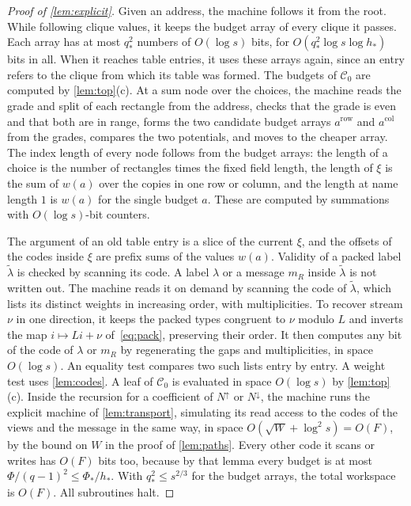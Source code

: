 \documentclass[11pt]{article}
\theoremstyle{definition}
\theoremstyle{definition}
\theoremstyle{remark}
\newcommand{\row}{\mathrm{row}}
\newcommand{\col}{\mathrm{col}}
\newcommand{\Nup}{N^{\uparrow}}
\newcommand{\Ndown}{N^{\downarrow}}
\begin{document}
\begin{proof}[Proof of \cref{lem:explicit}]
Given an address, the machine follows it from the root. While following clique values, it keeps the budget array of every clique it passes. Each array has at most $q_*^2$ numbers of $O(\log s)$ bits, for $O(q_*^2\log s\log h_*)$ bits in all. When it reaches table entries, it uses these arrays again, since an entry refers to the clique from which its table was formed. The budgets of $\mathcal C_0$ are computed by \cref{lem:top}(c). At a sum node over the choices, the machine reads the grade and split of each rectangle from the address, checks that the grade is even and that both are in range, forms the two candidate budget arrays $a^\row$ and $a^\col$ from the grades, compares the two potentials, and moves to the cheaper array. The index length of every node follows from the budget arrays: the length of a choice is the number of rectangles times the fixed field length, the length of $\xi$ is the sum of $w(a)$ over the copies in one row or column, and the length at name length $1$ is $w(a)$ for the single budget $a$. These are computed by summations with $O(\log s)$-bit counters.

The argument of an old table entry is a slice of the current $\xi$, and the offsets of the codes inside $\xi$ are prefix sums of the values $w(a)$. Validity of a packed label $\tilde\lambda$ is checked by scanning its code. A label $\lambda$ or a message $m_R$ inside $\tilde\lambda$ is not written out. The machine reads it on demand by scanning the code of $\tilde\lambda$, which lists its distinct weights in increasing order, with multiplicities. To recover stream $\nu$ in one direction, it keeps the packed types congruent to $\nu$ modulo $L$ and inverts the map $i\mapsto Li+\nu$ of~\eqref{eq:pack}, preserving their order. It then computes any bit of the code of $\lambda$ or $m_R$ by regenerating the gaps and multiplicities, in space $O(\log s)$. An equality test compares two such lists entry by entry. A weight test uses \cref{lem:codes}. A leaf of $\mathcal C_0$ is evaluated in space $O(\log s)$ by \cref{lem:top}(c). Inside the recursion for a coefficient of $\Nup$ or $\Ndown$, the machine runs the explicit machine of \cref{lem:transport}, simulating its read access to the codes of the views and the message in the same way, in space $O(\sqrt W+\log^2s)=O(F)$, by the bound on $W$ in the proof of \cref{lem:paths}. Every other code it scans or writes has $O(F)$ bits too, because by that lemma every budget is at most $\Phi/(q-1)^2\le\Phi_*/h_*$. With $q_*^2\le s^{2/3}$ for the budget arrays, the total workspace is $O(F)$. All subroutines halt.
\end{proof}
\end{document}
